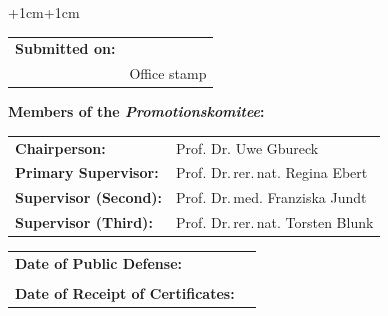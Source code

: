 \begin{adjustwidth}{+1cm}{+1cm} %

    \noindent
    \begin{tabular}{l l}
        \textbf{Submitted on:} & \dotuline{\hspace{10cm}} \\
                               & {\small Office stamp}    \\
    \end{tabular}


    \vspace{\vdouble}
    {\noindent\large \textbf{Members of the \textit{Promotionskomitee}:}}

    \vspace{\vhalf}
    \begin{tabular}{l l}
        \textbf{Chairperson:}         & Prof. Dr. Uwe Gbureck                \\
        \textbf{Primary Supervisor:}  & Prof. Dr.\,rer.\,nat. Regina Ebert  \\
        \textbf{Supervisor (Second):} & Prof. Dr.\,med. Franziska Jundt    \\
        \textbf{Supervisor (Third):}  & Prof. Dr.\,rer.\,nat. Torsten Blunk \\
    \end{tabular}


    \vspace{\vdouble}
    \noindent
    \begin{tabular}{l l}
        \textbf{Date of Public Defense:}          & \dotuline{\hspace{6.45cm}} \\
                                                  &                            \\
        \textbf{Date of Receipt of Certificates:} & \dotuline{\hspace{6.45cm}} \\
    \end{tabular}

\end{adjustwidth}

\thispagestyle{empty} %


\newpage


